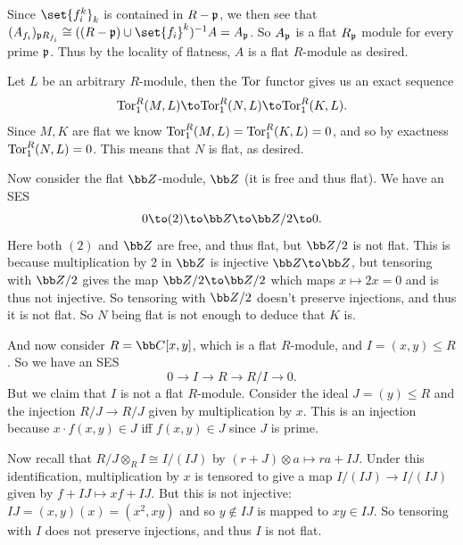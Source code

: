     Since $\set{f_i^k}_k$ is contained in $R-{{\frak p}}$, we then see that $(A_{f_i})_{\p R_{f_i}}\cong((R-\p)\cup\set{f_i}^k)^{-1}A=A_\p$.
    So $A_{{\frak p}}$ is a flat $R_{{\frak p}}$ module for every prime ${{\frak p}}$.
    Thus by the locality of flatness, $A$ is a flat $R$-module as desired.

    \item Let $L$ be an arbitrary $R$-module, then the ${\rm Tor}$ functor gives us an exact sequence
    $$ \tor^R_1(M,L) \to \tor^R_1(N,L) \to \tor^R_1(K,L) . $$
    Since $M,K$ are flat we know ${\rm Tor}^R_1(M,L)={\rm Tor}^R_1(K,L)=0$, and so by exactness ${\rm Tor}^R_1(N,L)=0$.
    This means that $N$ is flat, as desired.

    Now consider the flat $\bZ$-module, $\bZ$ (it is free and thus flat).
    We have an SES
    $$ 0 \to (2) \to \bZ \to \bZ/2 \to 0 . $$
    Here both $(2)$ and $\bZ$ are free, and thus flat, but $\bZ/2$ is not flat.
    This is because multiplication by $2$ in $\bZ$ is injective $\bZ\to\bZ$, but tensoring with $\bZ/2$ gives the map $\bZ/2\to\bZ/2$ which maps $x\mapsto 2x=0$ and is
    thus not injective.
    So tensoring with $\bZ/2$ doesn't preserve injections, and thus it is not flat.
    So $N$ being flat is not enough to deduce that $K$ is.

    And now consider $R=\bC[x,y]$, which is a flat $R$-module, and $I=(x,y)\leq R$.
    So we have an SES
    $$ 0 \to I \to R \to R/I \to 0 . $$
    But we claim that $I$ is not a flat $R$-module.
    Consider the ideal $J=(y)\leq R$ and the injection $R/J\to R/J$ given by multiplication by $x$.
    This is an injection because $x\cdot f(x,y)\in J$ iff $f(x,y)\in J$ since $J$ is prime.

    Now recall that $R/J\otimes_RI\cong I/(IJ)$ by $(r+J)\otimes a\mapsto ra+IJ$.
    Under this identification, multiplication by $x$ is tensored to give a map $I/(IJ)\to I/(IJ)$ given by $f+IJ\mapsto xf+IJ$.
    But this is not injective: $IJ=(x,y)(x)=(x^2,xy)$ and so $y\notin IJ$ is mapped to $xy\in IJ$.
    So tensoring with $I$ does not preserve injections, and thus $I$ is not flat.
\eenum

\bprob

